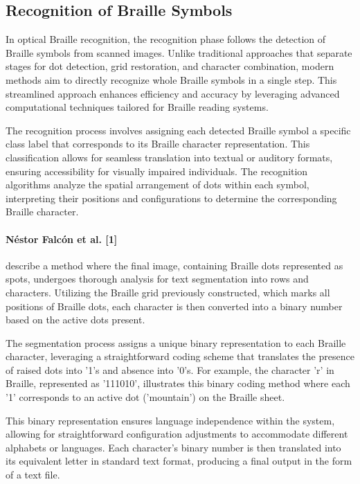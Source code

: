 \subsection{Recognition of Braille Symbols}

In optical Braille recognition, the recognition phase follows the detection of Braille symbols from scanned images. Unlike traditional approaches that separate stages for dot detection, grid restoration, and character combination, modern methods aim to directly recognize whole Braille symbols in a single step. This streamlined approach enhances efficiency and accuracy by leveraging advanced computational techniques tailored for Braille reading systems.

The recognition process involves assigning each detected Braille symbol a specific class label that corresponds to its Braille character representation. This classification allows for seamless translation into textual or auditory formats, ensuring accessibility for visually impaired individuals. The recognition algorithms analyze the spatial arrangement of dots within each symbol, interpreting their positions and configurations to determine the corresponding Braille character.

\paragraph{ Néstor Falcón et al. [1] }
describe a method where the final image, containing Braille dots represented as spots, undergoes thorough analysis for text segmentation into rows and characters. Utilizing the Braille grid previously constructed, which marks all positions of Braille dots, each character is then converted into a binary number based on the active dots present.

The segmentation process assigns a unique binary representation to each Braille character, leveraging a straightforward coding scheme that translates the presence of raised dots into '1's and absence into '0's. For example, the character 'r' in Braille, represented as '111010', illustrates this binary coding method where each '1' corresponds to an active dot ('mountain') on the Braille sheet.

This binary representation ensures language independence within the system, allowing for straightforward configuration adjustments to accommodate different alphabets or languages. Each character's binary number is then translated into its equivalent letter in standard text format, producing a final output in the form of a text file.


